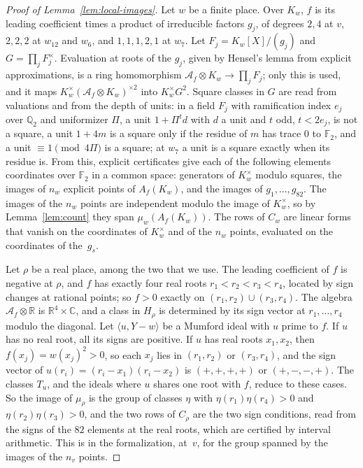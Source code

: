\documentclass[11pt]{amsart}
\theoremstyle{definition}
\numberwithin{equation}{section}
\newcommand{\F}{\mathbb{F}}
\newcommand{\Qt}{\mathbb{Q}_2}
\begin{document}
\begin{proof}[Proof of Lemma~\ref{lem:local-images}]
Let $w$ be a finite place. Over $K_w$, $f$ is its leading coefficient times a product of irreducible factors $g_j$, of degrees $2,4$ at $v$, $2,2,2$ at $w_{12}$ and $w_6$, and $1,1,1,2,1$ at $w_7$. Let $F_j=K_w[X]/(g_j)$ and $G=\prod_jF_j^\times$. Evaluation at roots of the $g_j$, given by Hensel's lemma from explicit approximations, is a ring homomorphism $\mathcal A_f\otimes K_w\to\prod_jF_j$; only this is used, and it maps $K_w^\times(\mathcal A_f\otimes K_w)^{\times2}$ into $K_w^\times G^2$. Square classes in $G$ are read from valuations and from the depth of units: in a field $F_j$ with ramification index $e_j$ over $\Qt$ and uniformizer $\Pi$, a unit $1+\Pi^td$ with $d$ a unit and $t$ odd, $t<2e_j$, is not a square, a unit $1+4m$ is a square only if the residue of $m$ has trace $0$ to $\F_2$, and a unit $\equiv1\pmod{4\Pi}$ is a square; at $w_7$ a unit is a square exactly when its residue is. From this, explicit certificates give each of the following elements coordinates over $\F_2$ in a common space: generators of $K_w^\times$ modulo squares, the images of $n_w$ explicit points of $A_f(K_w)$, and the images of $g_1,\dots,g_{82}$. The images of the $n_w$ points are independent modulo the image of $K_w^\times$, so by Lemma~\ref{lem:count} they span $\mu_w(A_f(K_w))$. The rows of $C_w$ are linear forms that vanish on the coordinates of $K_w^\times$ and of the $n_w$ points, evaluated on the coordinates of the~$g_s$.

Let $\rho$ be a real place, among the two that we use. The leading coefficient of $f$ is negative at $\rho$, and $f$ has exactly four real roots $r_1<r_2<r_3<r_4$, located by sign changes at rational points; so $f>0$ exactly on $(r_1,r_2)\cup(r_3,r_4)$. The algebra $\mathcal A_f\otimes\mathbb R$ is $\mathbb R^4\times\mathbb C$, and a class in $H_\rho$ is determined by its sign vector at $r_1,\dots,r_4$ modulo the diagonal. Let $\langle u,Y-w\rangle$ be a Mumford ideal with $u$ prime to $f$. If $u$ has no real root, all its signs are positive. If $u$ has real roots $x_1,x_2$, then $f(x_j)=w(x_j)^2>0$, so each $x_j$ lies in $(r_1,r_2)$ or $(r_3,r_4)$, and the sign vector of $u(r_i)=(r_i-x_1)(r_i-x_2)$ is $(+,+,+,+)$ or $(+,-,-,+)$. The classes $T_u$, and the ideals where $u$ shares one root with $f$, reduce to these cases. So the image of $\mu_\rho$ is the group of classes $\eta$ with $\eta(r_1)\eta(r_4)>0$ and $\eta(r_2)\eta(r_3)>0$, and the two rows of $C_\rho$ are the two sign conditions, read from the signs of the $82$ elements at the real roots, which are certified by interval arithmetic. This is  in the formalization, at~$v$, for the group spanned by the images of the $n_v$ points.
\end{proof}
\end{document}
